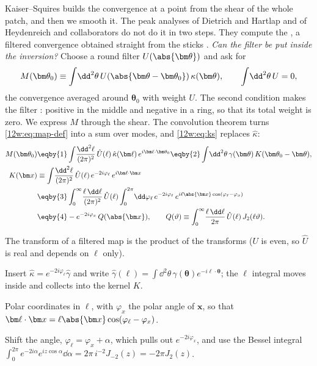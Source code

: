 Kaiser--Squires builds the convergence at a point from the shear of the whole patch, and then we smooth it. The
peak analyses of Dietrich and Hartlap and of Heydenreich and collaborators do not do it in two steps. They compute the
, a filtered convergence obtained straight from the sticks \cite{DietrichHartlap2010,
Heydenreich2021}. \emph{Can the filter be put inside the inversion?} Choose a round filter $U(\abs{\bm\theta})$ and
ask for
\begin{equation}
M(\bm\theta_0)\equiv\int\!\dd^2\theta\,U(\abs{\bm\theta-\bm\theta_0})\,\kappa(\bm\theta),
\qquad\int\!\dd^2\theta\,U=0,
\label{12w:eq:map-def}
\end{equation}
the convergence averaged around $\bm\theta_0$ with weight $U$. The second condition makes the filter
: positive in the middle and negative in a ring, so that its total weight is zero. We express
$M$ through the shear. The convolution theorem turns \eqref{12w:eq:map-def} into a sum over modes, and
\eqref{12w:eq:ks} replaces $\hat\kappa$:
\begin{align}
M(\bm\theta_0)
&\eqby{1}\int\!\frac{\dd^2\ell}{(2\pi)^2}\,\hat U(\ell)\,\hat\kappa(\bm\ell)\,e^{i\bm\ell\cdot\bm\theta_0}
\eqby{2}\int\!\dd^2\theta\,\gamma(\bm\theta)\,K(\bm\theta_0-\bm\theta),
\nonumber\\
K(\bm x)
&\equiv\int\!\frac{\dd^2\ell}{(2\pi)^2}\,\hat U(\ell)\,e^{-2i\varphi_\ell}\,e^{i\bm\ell\cdot\bm x}
\nonumber\\
&\eqby{3}\int_0^\infty\!\frac{\ell\,\dd\ell}{(2\pi)^2}\,\hat U(\ell)\int_0^{2\pi}\!\dd\varphi_\ell\,
e^{-2i\varphi_\ell}\,e^{i\ell\abs{\bm x}\cos(\varphi_\ell-\varphi_x)}
\nonumber\\
&\eqby{4}-e^{-2i\varphi_x}\,Q(\abs{\bm x}),
\qquad Q(\vartheta)\equiv\int_0^\infty\!\frac{\ell\,\dd\ell}{2\pi}\,\hat U(\ell)\,J_2(\ell\vartheta).
\label{12w:eq:map-chain}
\end{align}
\begin{explain}
  \item The transform of a filtered map is the product of the transforms ($U$ is even, so $\hat U$ is real and
        depends on $\ell$ only).
  \item Insert $\hat\kappa=e^{-2i\varphi_\ell}\hat\gamma$ and write $\hat\gamma(\bm\ell)=\int\dd^2\theta\,\gamma(\bm\theta)
        e^{-i\bm\ell\cdot\bm\theta}$; the $\bm\ell$ integral moves inside and collects into the kernel $K$.
  \item Polar coordinates in $\bm\ell$, with $\varphi_x$ the polar angle of $\bm x$, so that $\bm\ell\cdot\bm x=
        \ell\abs{\bm x}\cos(\varphi_\ell-\varphi_x)$.
  \item Shift the angle, $\varphi_\ell=\varphi_x+\alpha$, which pulls out $e^{-2i\varphi_x}$, and use the Bessel
        integral $\int_0^{2\pi}e^{-2i\alpha}e^{iz\cos\alpha}\dd\alpha=2\pi\,i^{-2}J_{-2}(z)=-2\pi J_2(z)$.
\end{explain}
